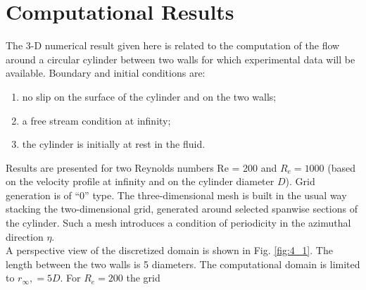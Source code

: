 \documentclass[11pt]{report}
\newcommand{\NI}{\noindent}
\begin{document}
	\section{Computational Results}
	The 3-D numerical result given here is related to the computation of the flow around a circular cylinder between two walls for which experimental data will be available. Boundary and initial conditions are: 
	\begin{enumerate}
		\item 	no slip on the surface of the cylinder and on the two walls; 
		\item  a free stream condition at infinity; 
		\item the cylinder is initially at rest in the fluid. 
	\end{enumerate}
	Results are presented for two Reynolds numbers Re = 200 and $R_e = 1000$ (based on the velocity profile at infinity and on the cylinder diameter $D$). Grid generation is of “0” type. The three-dimensional mesh is built in the
	usual way stacking the two-dimensional grid, generated around selected spanwise sections of the cylinder. Such a mesh introduces a condition of periodicity in the azimuthal direction $\eta$.\\
	
	\NI A perspective view of the discretized domain is shown in Fig. \ref{fig:4_1}. The length between the two walls is 5 diameters. The computational domain is limited to $r_\infty, = 5D$. For $R_e = 200$ the grid 
\end{document}
